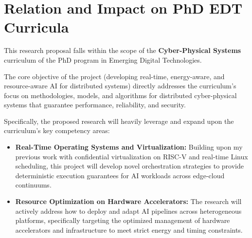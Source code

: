 \documentclass[11pt,a4paper]{article}
\begin{document}
\section{Relation and Impact on PhD EDT Curricula}
This research proposal falls within the scope of the \textbf{Cyber-Physical Systems} curriculum of the PhD program in Emerging Digital Technologies.

The core objective of the project (developing real-time, energy-aware, and resource-aware AI for distributed systems) directly addresses the curriculum's focus on methodologies, models, and algorithms for distributed cyber-physical systems that guarantee performance, reliability, and security.

Specifically, the proposed research will heavily leverage and expand upon the curriculum's key competency areas:
\begin{itemize}[leftmargin=*]
    \item \textbf{Real-Time Operating Systems and Virtualization:} Building upon my previous work with confidential virtualization on RISC-V and real-time Linux scheduling, this project will develop novel orchestration strategies to provide deterministic execution guarantees for AI workloads across edge-cloud continuums.
    \item \textbf{Resource Optimization on Hardware Accelerators:} The research will actively address how to deploy and adapt AI pipelines across heterogeneous platforms, specifically targeting the optimized management of hardware accelerators and infrastructure to meet strict energy and timing constraints.
\end{itemize}

\newpage
\printbibliography[heading=bibintoc, title={References}]
\end{document}
